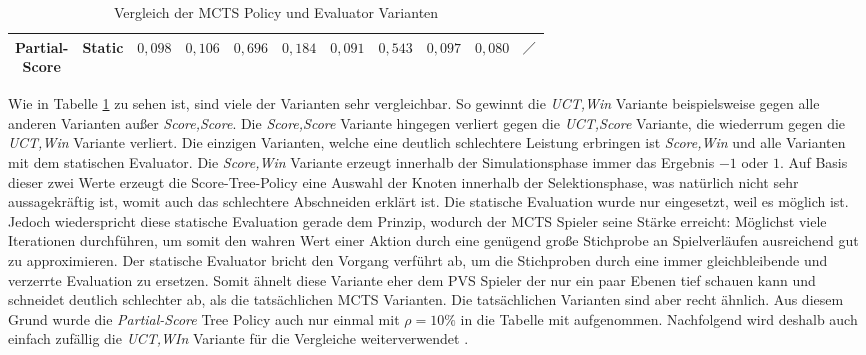 \begin{table}[H]
{\begin{tabular}{|c|c|c|c|c|c|c|c|c|c|c|}
            \tiny \makecell{Partial-                                                                                                                                                                                                                                                                                                                                                              \\Score} &        Static & \cellcolor[HTML]{f9826f}$0{,}098$ & \cellcolor[HTML]{f98470}$0{,}106$ & \cellcolor[HTML]{c2da81}$0{,}696$ & \cellcolor[HTML]{fa9874}$0{,}184$ & \cellcolor[HTML]{f9806f}$0{,}091$ & \cellcolor[HTML]{f2e884}$0{,}543$ & \cellcolor[HTML]{f9826f}$0{,}097$ & \cellcolor[HTML]{f97d6e}$0{,}080$ & $\diagup$                         \\ \hline
        \end{tabular}}
    \vspace{3pt}
    \caption{Vergleich der \acs{MCTS} Policy und Evaluator Varianten}
    \label{tabelle:mcts-policy-eval-comparision}
\end{table}

Wie in Tabelle \ref{tabelle:mcts-policy-eval-comparision} zu sehen ist, sind viele der Varianten sehr vergleichbar. So gewinnt die \emph{\acs{UCT},Win} Variante beispielsweise gegen alle anderen Varianten außer \emph{Score,Score}. Die \emph{Score,Score} Variante hingegen verliert gegen die \emph{\acs{UCT},Score} Variante, die wiederrum gegen die \emph{\acs{UCT},Win} Variante verliert. Die einzigen Varianten, welche eine deutlich schlechtere Leistung erbringen ist \emph{Score,Win} und alle Varianten mit dem statischen Evaluator. Die \emph{Score,Win} Variante erzeugt innerhalb der Simulationsphase immer das Ergebnis $-1$ oder $1$. Auf Basis dieser zwei Werte erzeugt die Score-Tree-Policy eine Auswahl der Knoten innerhalb der Selektionsphase, was natürlich nicht sehr aussagekräftig ist, womit auch das schlechtere Abschneiden erklärt ist. Die statische Evaluation wurde nur eingesetzt, weil es möglich ist. Jedoch wiederspricht diese statische Evaluation gerade dem Prinzip, wodurch der \ac{MCTS} Spieler seine Stärke erreicht: Möglichst viele Iterationen durchführen, um somit den wahren Wert einer Aktion durch eine genügend große Stichprobe an Spielverläufen ausreichend gut zu approximieren. Der statische Evaluator bricht den Vorgang verführt ab, um die Stichproben durch eine immer gleichbleibende und verzerrte Evaluation zu ersetzen. Somit ähnelt diese Variante eher dem \ac{PVS} Spieler der nur ein paar Ebenen tief schauen kann und schneidet deutlich schlechter ab, als die tatsächlichen \ac{MCTS} Varianten. Die tatsächlichen Varianten sind aber recht ähnlich. Aus diesem Grund wurde die \emph{Partial-Score} Tree Policy auch nur einmal mit $\rho = 10\%$ in die Tabelle mit aufgenommen. Nachfolgend wird deshalb auch einfach zufällig die \emph{\acs{UCT},WIn} Variante für die Vergleiche weiterverwendet .

